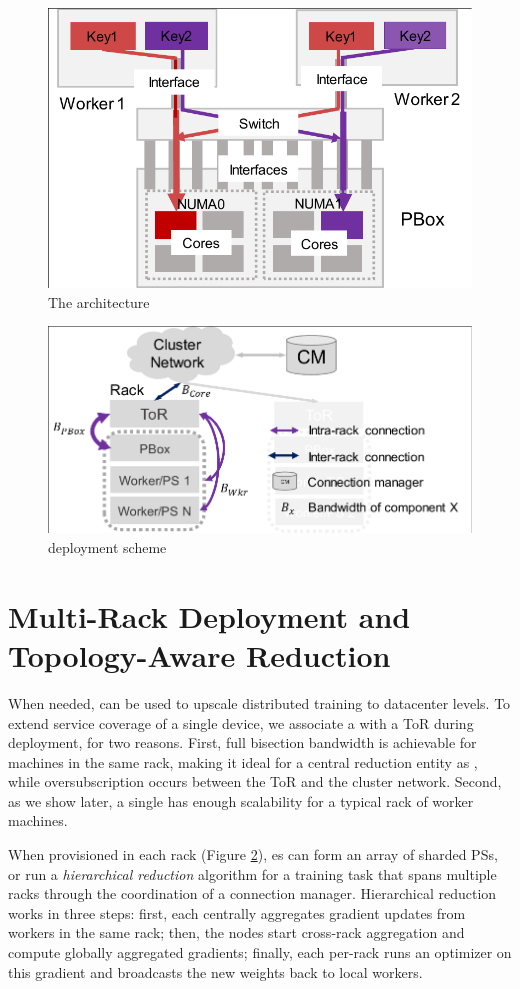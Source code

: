 \begin{figure}[t!]
	\centering
	\includegraphics[width=.6\linewidth,trim=2 1 1 1,clip]{Figures/PHubOverview.pdf}
	\caption{The \pbox architecture}
	\label{fig:phub}
\end{figure}



\begin{figure}[t!]
	\centering
	\includegraphics[width=.6\linewidth,trim=3 1 1 2,clip]{Figures/PBoxDeployment.pdf}
	\caption{\pbox deployment scheme}
	\label{fig:pBoxDeployment}
\end{figure}


\section{Multi-Rack Deployment and Topology-Aware Reduction}
\label{sec:hierarchicalReduction}
When needed, \pbox can be used to upscale distributed training to datacenter levels. To extend service coverage of a single \pbox device, we associate a \pbox with a ToR during deployment, for two reasons. First, full bisection bandwidth is achievable for machines in the same rack, making it ideal for a central reduction entity as \pbox, while oversubscription occurs between the ToR and the cluster network. Second, as we show later, a single \pbox has enough scalability for a typical rack of worker machines.

When provisioned in each rack (Figure \ref{fig:pBoxDeployment}), \pbox{}es can form an array of sharded PSs, or run a \textit{hierarchical reduction} algorithm for a training task that spans multiple racks through the coordination of a connection manager. Hierarchical reduction works in three steps: first, each \pbox centrally aggregates gradient updates from workers in the same rack; then, the \pbox{} nodes start cross-rack aggregation and compute globally aggregated gradients; finally, each per-rack \pbox runs an optimizer on this gradient and broadcasts the new weights back to local workers.

